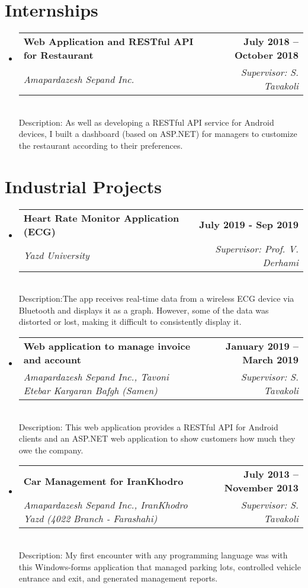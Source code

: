 \documentclass[letterpaper,11pt]{article}
\makeatletter
\newcommand{\resumeSubheading}[4]{
  \vspace{-2pt}\item
    \begin{tabular*}{1.0\textwidth}[t]{l@{\extracolsep{\fill}}r}
      \textbf{#1} & \textbf{\small #2} \\
    \textcolor{sgray} {\textit{\small#3}} & \textcolor{sgray}{ \textit{\small #4} }\\
    \end{tabular*}\vspace{-7pt}
}
\newcommand{\resumeSubheadingD}[5]{
  \vspace{-2pt}\item
    \begin{tabular*}{1.0\textwidth}[t]{l@{\extracolsep{\fill}}r}
      \textbf{#1} & \textbf{\small #2} \\
    \textcolor{sgray} {\textit{\small#3}} & \textcolor{sgray}{ \textit{\small #4} }\\
    \end{tabular*} %
    \\ \vspace{3pt}
    Description:{#5}
}
\newcommand{\resumeSubHeadingListStart}{\begin{itemize}[leftmargin=0.0in, label={}]}
\newcommand{\resumeSubHeadingListEnd}{\end{itemize}}
\makeatother
\begin{document}
  
\begin{comment}
\resumeSubHeadingListStart
    \resumeSubheading
      {Malek Sabet High School}{Sep 2012 - June. 2016}
      {Diploma in Physics and Mathematics Discipline}{Yazd, Iran}
  \resumeSubHeadingListEnd
 \small{ GPA: \textbf{19.49}/20, Units: 102, {\href{https://en.wikipedia.org/wiki/Governmental_leading_high_school}{ Affiliation: Governmental leading high school}}
\end{comment}  


\section{Internships}

\resumeSubHeadingListStart
\resumeSubheadingD
{Web Application and RESTful API for Restaurant}{July 2018 – October 2018}
{Amapardazesh Sepand Inc. }{Supervisor: S. Tavakoli}
{
	As well as developing a RESTful API service for Android devices, I built a dashboard  (based on ASP.NET) for managers to customize the restaurant according to their preferences.
}
\resumeSubHeadingListEnd

\section{Industrial Projects}

\resumeSubHeadingListStart
\resumeSubheadingD
{Heart Rate Monitor Application (ECG)}{
	July 2019 - Sep 2019
}
{Yazd University}
{Supervisor: Prof. V. Derhami}
{The app receives real-time data from a wireless ECG device via Bluetooth and displays it as a graph. However, some of the data was distorted or lost, making it difficult to consistently display it. }
\resumeSubHeadingListEnd


\resumeSubHeadingListStart
\resumeSubheadingD
{Web application to manage invoice and account }{January 2019 – March 2019}
{Amapardazesh Sepand Inc., Tavoni Etebar Kargaran Bafgh (Samen)}{Supervisor: S. Tavakoli}
{
	This web application provides a RESTful API for Android clients and an ASP.NET web application to show customers how much they owe the company.}
\resumeSubHeadingListEnd




\resumeSubHeadingListStart
\resumeSubheadingD
{Car Management for IranKhodro}{July 2013 – November 2013}
{Amapardazesh Sepand Inc., IranKhodro Yazd (4022 Branch - Farashahi)}{Supervisor: S. Tavakoli}
{ My first encounter with any programming language was with this Windows-forms application that managed parking lots, controlled vehicle entrance and exit, and generated management reports. }
\resumeSubHeadingListEnd
\end{document}
